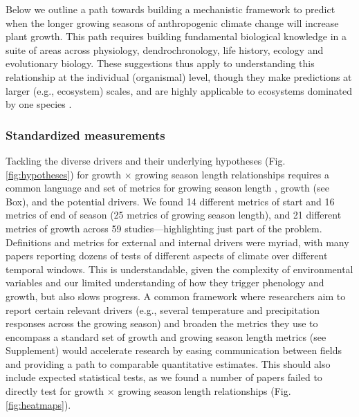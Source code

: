 \documentclass[11pt]{article}
\begin{document}

Below we outline a path towards building a mechanistic framework to predict when the longer growing seasons of anthropogenic climate change will increase plant growth. This path requires building fundamental biological knowledge in a suite of areas across physiology, dendrochronology, life history, ecology and evolutionary biology. These suggestions thus apply to understanding this relationship at the individual (organismal) level, though they make predictions at larger (e.g., ecosystem) scales, and are highly applicable to ecosystems dominated by one species \citep[e.g.,][]{chen1999effects}. %

\subsubsection*{Standardized measurements} %

Tackling the diverse drivers and their underlying hypotheses (Fig. \ref{fig:hypotheses}) for growth $\times$ growing season length relationships requires a common language and set of metrics for growing season length \citep{korner2023four}, growth (see Box), and the potential drivers. We found 14 different metrics of start and 16 metrics of end of season (25 metrics of growing season length), and 21 different metrics of growth across 59 studies---highlighting just part of the problem. Definitions and metrics for external and internal drivers were myriad, with many papers reporting dozens of tests of different aspects of climate over different temporal windows. This is understandable, given the complexity of environmental variables and our limited understanding of how they trigger phenology and growth, but also slows progress. A common framework where researchers aim to report certain relevant drivers (e.g., several temperature and precipitation responses across the growing season) and broaden the metrics they use to encompass a standard set of growth and growing season length metrics (see Supplement) would accelerate research by easing communication between fields and providing a path to comparable quantitative estimates. This should also include expected statistical tests, as we found a number of papers failed to directly test for growth $\times$ growing season length relationships (Fig. \ref{fig:heatmaps}). %
\end{document}
